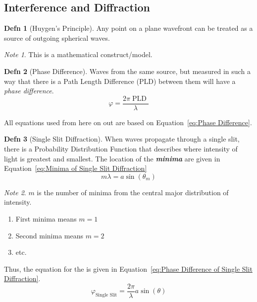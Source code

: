 \documentclass[10pt,letterpaper,final,twoside,notitlepage]{article}
\numberwithin{equation}{section} %
\theoremstyle{definition}
\newtheorem{definition}{Defn} %
\theoremstyle{remark}
\newtheorem{note}{Note}[definition] %
\DeclareMathOperator{\PLD}{\text{PLD}}
\begin{document}
	\subsection*{Interference and Diffraction} \label{subsec:Interference and Diffraction}
		\begin{definition}[Huygen's Principle] \label{def:Huygen's Principle}
			Any point on a plane wavefront can be treated as a source of outgoing spherical waves.
			\begin{note}
				This is a mathematical construct/model.
			\end{note}
		\end{definition}
		\begin{definition}[Phase Difference] \label{def:Phase Difference}
			Waves from the same source, but measured in such a way that there is a Path Length Difference (PLD) between them will have a \emph{phase difference}.
			\begin{equation} \label{eq:Phase Difference}
				\varphi = \frac{2 \pi \PLD}{\lambda}
			\end{equation}
		\end{definition}
	All  equations used from here on out are based on Equation~\eqref{eq:Phase Difference}.
		\begin{definition}[Single Slit Diffraction] \label{def: Single Slit Diffraction}
			When waves propagate through a single slit, there is a Probability Distribution Function that describes where intensity of light is greatest and smallest.
			The location of the \emph{\textbf{minima}} are given in Equation~\eqref{eq:Minima of Single Slit Diffraction}
			\begin{equation} \label{eq:Minima of Single Slit Diffraction}
				m \lambda = a \sin \left( \theta_{m} \right)
			\end{equation}
			\begin{note}
				$m$ is the number of minima from the central major distribution of intensity.
				\begin{enumerate}
					\item First minima means $m=1$
					\item Second minima means $m=2$
					\item etc.
				\end{enumerate}
			\end{note}
			Thus, the equation for the  is given in Equation~\eqref{eq:Phase Difference of Single Slit Diffraction}.
			\begin{equation} \label{eq:Phase Difference of Single Slit Diffraction}
				\varphi_{\text{Single Slit}} = \frac{2 \pi}{\lambda} a \sin \left( \theta \right)
			\end{equation}
		\end{definition}
\end{document}

